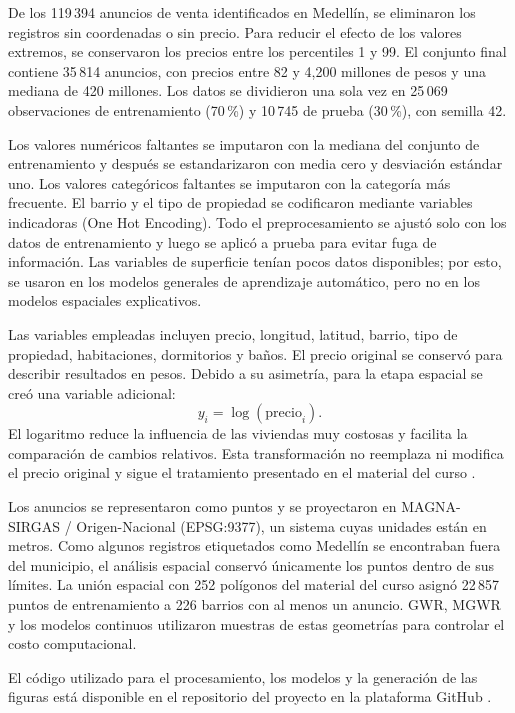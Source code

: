 \documentclass[conference]{IEEEtran}
\begin{document}
De los 119\,394 anuncios de venta identificados en Medellín, se eliminaron los registros sin coordenadas o sin precio. Para reducir el efecto de los valores extremos, se conservaron los precios entre los percentiles 1 y 99. El conjunto final contiene 35\,814 anuncios, con precios entre 82 y 4,200 millones de pesos y una mediana de 420 millones. Los datos se dividieron una sola vez en 25\,069 observaciones de entrenamiento (70\,\%) y 10\,745 de prueba (30\,\%), con semilla 42.

Los valores numéricos faltantes se imputaron con la mediana del conjunto de entrenamiento y después se estandarizaron con media cero y desviación estándar uno. Los valores categóricos faltantes se imputaron con la categoría más frecuente. El barrio y el tipo de propiedad se codificaron mediante variables indicadoras (One Hot Encoding). Todo el preprocesamiento se ajustó solo con los datos de entrenamiento y luego se aplicó a prueba para evitar fuga de información. Las variables de superficie tenían pocos datos disponibles; por esto, se usaron en los modelos generales de aprendizaje automático, pero no en los modelos espaciales explicativos.

Las variables empleadas incluyen precio, longitud, latitud, barrio, tipo de propiedad, habitaciones, dormitorios y baños. El precio original se conservó para describir resultados en pesos. Debido a su asimetría, para la etapa espacial se creó una variable adicional:
\begin{equation*}
    y_i=\log(\text{precio}_i).
\end{equation*}
El logaritmo reduce la influencia de las viviendas muy costosas y facilita la comparación de cambios relativos. Esta transformación no reemplaza ni modifica el precio original y sigue el tratamiento presentado en el material del curso \cite{materialcurso}.

Los anuncios se representaron como puntos y se proyectaron en MAGNA-SIRGAS / Origen-Nacional (EPSG:9377), un sistema cuyas unidades están en metros. Como algunos registros etiquetados como Medellín se encontraban fuera del municipio, el análisis espacial conservó únicamente los puntos dentro de sus límites. La unión espacial con 252 polígonos del material del curso asignó 22\,857 puntos de entrenamiento a 226 barrios con al menos un anuncio. GWR, MGWR y los modelos continuos utilizaron muestras de estas geometrías para controlar el costo computacional.

El código utilizado para el procesamiento, los modelos y la generación de las figuras está disponible en el repositorio del proyecto en la plataforma GitHub \cite{repositorio}.
\end{document}
